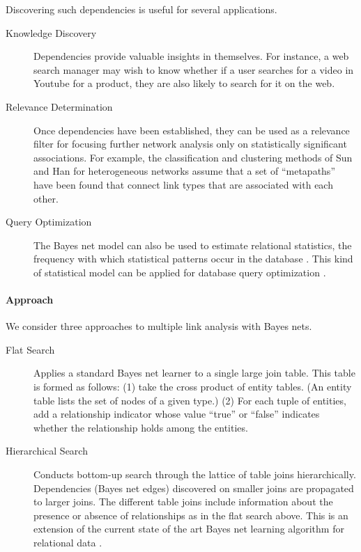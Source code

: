 \documentclass{article}
\begin{document}
Discovering such dependencies is useful for several applications. 

\begin{description}
\item[Knowledge Discovery] Dependencies provide valuable insights in themselves. For instance, a web search manager may wish to know whether if a user searches for a video in Youtube for a product, they are also likely to search for it on the web. 
\item[Relevance Determination] Once dependencies have been established, they can be used as a relevance filter for focusing further network analysis only on statistically significant associations. For example, the classification and clustering methods of Sun and Han \cite{Sun2012} for heterogeneous networks assume that a set of ``metapaths'' have been found that connect link types that are associated with each other. 
\item[Query Optimization] The Bayes net model can also be used to estimate relational statistics, the frequency with which statistical patterns occur in the database \cite{Schulte2012b}. This kind of statistical model can be applied for database query optimization \cite{Getoor2001}.
\end{description}

\paragraph{Approach}

We consider three approaches to multiple link analysis with Bayes nets. 

\begin{description}
\item[Flat Search] Applies a standard Bayes net learner to a single large join table. This table is formed as follows: (1) take the cross product of entity tables. (An entity table lists the set of nodes of a given type.) (2) For each tuple of entities, add a relationship indicator whose value ``true'' or ``false'' indicates whether the relationship holds among the entities. 
\item[Hierarchical Search] Conducts bottom-up  search
 through the lattice of table joins hierarchically. Dependencies (Bayes net edges) discovered on smaller joins are propagated to larger joins. 
The different table joins include information about the presence or absence of relationships as in the flat search above. 
This is an extension of the current state of the art Bayes net learning algorithm for relational data \cite{Schulte2012}.
\end{description}
\end{document}
